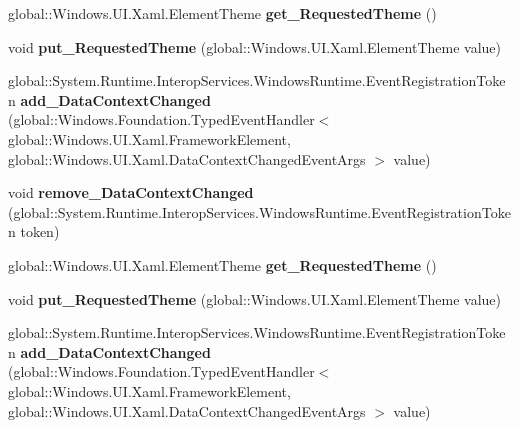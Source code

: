 \begin{DoxyCompactItemize}
global\+::\+Windows.\+U\+I.\+Xaml.\+Element\+Theme {\bfseries get\+\_\+\+Requested\+Theme} ()
\item 
\mbox{\label{interface_windows_1_1_u_i_1_1_xaml_1_1_i_framework_element2_a26887378d15655bc116fd7e94f99fc48}} 
void {\bfseries put\+\_\+\+Requested\+Theme} (global\+::\+Windows.\+U\+I.\+Xaml.\+Element\+Theme value)
\item 
\mbox{\label{interface_windows_1_1_u_i_1_1_xaml_1_1_i_framework_element2_a204d781ea5edc2c05e9d47534d5027ae}} 
global\+::\+System.\+Runtime.\+Interop\+Services.\+Windows\+Runtime.\+Event\+Registration\+Token {\bfseries add\+\_\+\+Data\+Context\+Changed} (global\+::\+Windows.\+Foundation.\+Typed\+Event\+Handler$<$ global\+::\+Windows.\+U\+I.\+Xaml.\+Framework\+Element, global\+::\+Windows.\+U\+I.\+Xaml.\+Data\+Context\+Changed\+Event\+Args $>$ value)
\item 
\mbox{\label{interface_windows_1_1_u_i_1_1_xaml_1_1_i_framework_element2_a04219d0d5da2859d2265a4df37e64985}} 
void {\bfseries remove\+\_\+\+Data\+Context\+Changed} (global\+::\+System.\+Runtime.\+Interop\+Services.\+Windows\+Runtime.\+Event\+Registration\+Token token)
\item 
\mbox{\label{interface_windows_1_1_u_i_1_1_xaml_1_1_i_framework_element2_a969f6e448f093c9b73dff8beca767352}} 
global\+::\+Windows.\+U\+I.\+Xaml.\+Element\+Theme {\bfseries get\+\_\+\+Requested\+Theme} ()
\item 
\mbox{\label{interface_windows_1_1_u_i_1_1_xaml_1_1_i_framework_element2_a26887378d15655bc116fd7e94f99fc48}} 
void {\bfseries put\+\_\+\+Requested\+Theme} (global\+::\+Windows.\+U\+I.\+Xaml.\+Element\+Theme value)
\item 
\mbox{\label{interface_windows_1_1_u_i_1_1_xaml_1_1_i_framework_element2_a204d781ea5edc2c05e9d47534d5027ae}} 
global\+::\+System.\+Runtime.\+Interop\+Services.\+Windows\+Runtime.\+Event\+Registration\+Token {\bfseries add\+\_\+\+Data\+Context\+Changed} (global\+::\+Windows.\+Foundation.\+Typed\+Event\+Handler$<$ global\+::\+Windows.\+U\+I.\+Xaml.\+Framework\+Element, global\+::\+Windows.\+U\+I.\+Xaml.\+Data\+Context\+Changed\+Event\+Args $>$ value)

\end{DoxyCompactItemize}

